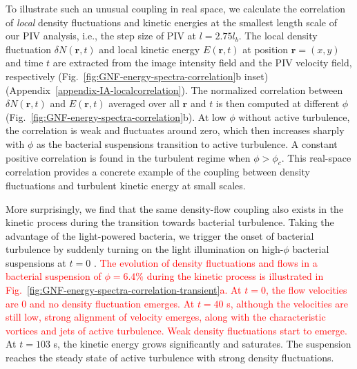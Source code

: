 \documentclass[twocolumn,aps,prx,amsmath,amssymb,longbibliography,superscriptaddress]{revtex4-2}
\begin{document}
To illustrate such an unusual coupling in real space, we calculate the correlation of \emph{local} density fluctuations and kinetic energies at the smallest length scale of our PIV analysis, i.e., the step size of PIV at $l = 2.75l_b$. The local density fluctuation $\delta N(\bm{r},t)$ and local kinetic energy $E(\bm{r},t)$ at position $\bm{r} = (x,y)$ and time $t$ are extracted from the image intensity field and the PIV velocity field, respectively (Fig.~\ref{fig:GNF-energy-spectra-correlation}b inset) (Appendix~\ref{appendix-IA-localcorrelation}).
The normalized correlation between $\delta N(\bm{r},t)$ and $E(\bm{r},t)$ averaged over all $\bm{r}$ and $t$ is then computed at different $\phi$ (Fig.~\ref{fig:GNF-energy-spectra-correlation}b). At low $\phi$ without active turbulence, the correlation is weak and fluctuates around zero, which then increases sharply with $\phi$ as the bacterial suspensions transition to active turbulence. A constant positive correlation is found in the turbulent regime when $\phi > \phi_c$. This real-space correlation provides a concrete example of the coupling between density fluctuations and turbulent kinetic energy at small scales.



More surprisingly, we find that the same density-flow coupling also exists in the kinetic process during the transition towards bacterial turbulence. Taking the advantage of the light-powered bacteria, we trigger the onset of bacterial turbulence by suddenly turning on the light illumination on high-$\phi$ bacterial suspensions at $t=0$ \cite{Peng2020}.
\textcolor{red}{The evolution of density fluctuations and flows in a bacterial suspension of $\phi = 6.4\%$ during the kinetic process is illustrated in Fig.~\ref{fig:GNF-energy-spectra-correlation-transient}a.}
\textcolor{red}{At $t=0$, the flow velocities are 0 and no density fluctuation emerges. At $t=40$ s, although the velocities are still low, strong alignment of velocity emerges, along with the characteristic vortices and jets of active turbulence. Weak density fluctuations start to emerge.}
At $t=103$ s, the kinetic energy grows significantly and saturates. The suspension reaches the steady state of active turbulence with strong density fluctuations.
\end{document}
